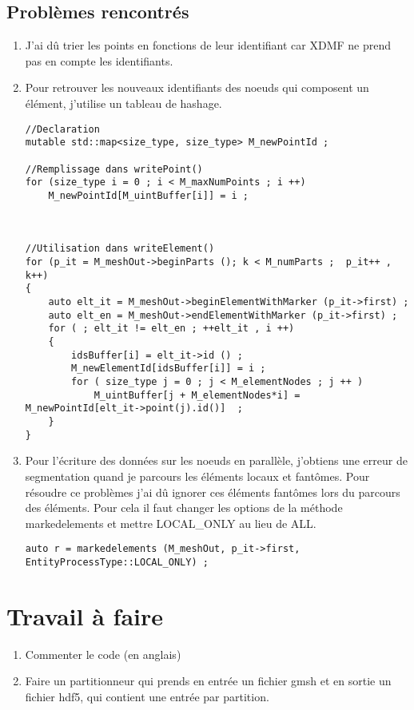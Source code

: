 \documentclass[10pt]{article}
\begin{document}
\subsection {Problèmes rencontrés} 
\begin{enumerate}
\item J'ai dû trier les points en fonctions de leur identifiant car XDMF ne prend pas en compte les identifiants.\newline
\item Pour retrouver les nouveaux identifiants des noeuds qui composent un élément, j'utilise un tableau de hashage.
\begin {lstlisting}
//Declaration
mutable std::map<size_type, size_type> M_newPointId ;

//Remplissage dans writePoint()
for (size_type i = 0 ; i < M_maxNumPoints ; i ++) 
    M_newPointId[M_uintBuffer[i]] = i ;



//Utilisation dans writeElement()
for (p_it = M_meshOut->beginParts (); k < M_numParts ;  p_it++ , k++)
{
    auto elt_it = M_meshOut->beginElementWithMarker (p_it->first) ;
    auto elt_en = M_meshOut->endElementWithMarker (p_it->first) ;
    for ( ; elt_it != elt_en ; ++elt_it , i ++)
    {
        idsBuffer[i] = elt_it->id () ;
        M_newElementId[idsBuffer[i]] = i ;
        for ( size_type j = 0 ; j < M_elementNodes ; j ++ )
            M_uintBuffer[j + M_elementNodes*i] = M_newPointId[elt_it->point(j).id()]  ; 
    }
}
\end{lstlisting}
\item Pour l'écriture des données sur les noeuds en parallèle, j'obtiens une erreur de segmentation quand je parcours les éléments locaux et fantômes. Pour résoudre ce problèmes j'ai dû ignorer ces éléments fantômes lors du parcours des éléments. Pour cela il faut changer les options de la méthode markedelements et mettre LOCAL\_ONLY au lieu de ALL.
\begin{lstlisting}
auto r = markedelements (M_meshOut, p_it->first, EntityProcessType::LOCAL_ONLY) ;
\end{lstlisting}
\end{enumerate}
\section {Travail à faire}
\begin{enumerate}
\item Commenter le code (en anglais)
\item Faire un partitionneur qui prends en entrée un fichier gmsh et en sortie un fichier hdf5, qui contient une entrée par partition.
\end{enumerate}
\end{document}

